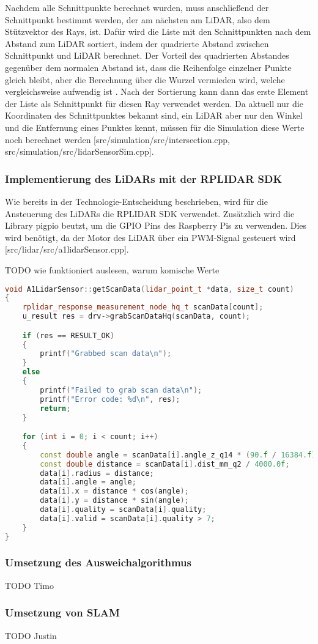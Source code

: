 Nachdem alle Schnittpunkte berechnet wurden, muss anschließend der Schnittpunkt bestimmt werden, der am nächsten am LiDAR, also dem Stützvektor des Rays, ist. Dafür wird die Liste mit den Schnittpunkten nach dem Abstand zum LiDAR sortiert, indem der quadrierte Abstand zwischen Schnittpunkt und LiDAR berechnet. Der Vorteil des quadrierten Abstandes gegenüber dem normalen Abstand ist, dass die Reihenfolge einzelner Punkte gleich bleibt, aber die Berechnung über die Wurzel vermieden wird, welche vergleichsweise aufwendig ist \cite{stackexchangeAreThereAny2012}. Nach der Sortierung kann dann das erste Element der Liste als Schnittpunkt für diesen Ray verwendet werden. Da aktuell nur die Koordinaten des Schnittpunktes bekannt sind, ein LiDAR aber nur den Winkel und die Entfernung eines Punktes kennt, müssen für die Simulation diese Werte noch berechnet werden [src/simulation/src/intersection.cpp, src/simulation/src/lidarSensorSim.cpp]. 

\subsubsection{Implementierung des LiDARs mit der RPLIDAR SDK}

Wie bereits in der Technologie-Entscheidung beschrieben, wird für die Ansteuerung des LiDARs die RPLIDAR SDK verwendet. Zusätzlich wird die Library pigpio beutzt, um die GPIO Pins des Raspberry Pis zu verwenden. Dies wird benötigt, da der Motor des LiDAR über ein PWM-Signal gesteuert wird [src/lidar/src/a1lidarSensor.cpp]. 

TODO wie funktioniert auslesen, warum komische Werte

\begin{lstlisting}[caption={Auslesen der LiDAR Daten},label={lst:auslesen_lidar},language={C++}]
void A1LidarSensor::getScanData(lidar_point_t *data, size_t count)
{
    rplidar_response_measurement_node_hq_t scanData[count];
    u_result res = drv->grabScanDataHq(scanData, count);

    if (res == RESULT_OK)
    {
        printf("Grabbed scan data\n");
    }
    else
    {
        printf("Failed to grab scan data\n");
        printf("Error code: %d\n", res);
        return;
    }

    for (int i = 0; i < count; i++)
    {
        const double angle = scanData[i].angle_z_q14 * (90.f / 16384.f);
        const double distance = scanData[i].dist_mm_q2 / 4000.0f;
        data[i].radius = distance;
        data[i].angle = angle;
        data[i].x = distance * cos(angle);
        data[i].y = distance * sin(angle);
        data[i].quality = scanData[i].quality;
        data[i].valid = scanData[i].quality > 7;
    }
}
\end{lstlisting}

\subsubsection{Umsetzung des Ausweichalgorithmus}



TODO Timo

\subsubsection{Umsetzung von SLAM}

TODO Justin

\newpage
